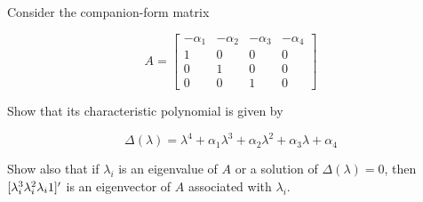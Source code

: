 \item[3.14] Consider the companion-form matrix

\begin{equation*}
 A = \begin{bmatrix}
      -\alpha_1 & -\alpha_2 & -\alpha_3 & -\alpha_4\\
      1 & 0 & 0 & 0\\
      0 & 1 & 0 & 0\\
      0 & 0 & 1 & 0
     \end{bmatrix}
\end{equation*}

Show that its characteristic polynomial is given by

\begin{equation*}
\Delta(\lambda) = \lambda^4 + \alpha_1 \lambda^3 + \alpha_2 \lambda^2 + \alpha_3 \lambda + \alpha_4
\end{equation*}

Show also that if $\lambda_i$ is an eigenvalue of $A$ or a solution of $\Delta (\lambda) = 0$, then $[\lambda_i^3 \/ \lambda_i^2 \/ \lambda_i \/ 1]'$ is an eigenvector of $A$ associated with $\lambda_i$.
